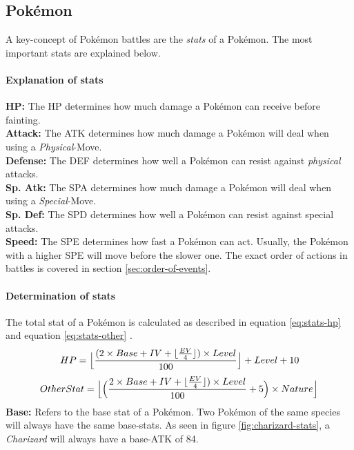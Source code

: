 \subsection{Pokémon}
\label{sec:pokemon}
A key-concept of Pokémon battles are the \textit{stats} of a Pokémon. The most important stats
are explained below. 
\paragraph{Explanation of stats}
\textbf{HP:} The \ac{HP} determines how much damage a Pokémon can receive before fainting. \\
\textbf{Attack:} The \ac{ATK} determines how much damage a Pokémon will deal when using 
a \textit{Physical}-Move. \\
\textbf{Defense:} The \ac{DEF} determines how well a Pokémon can resist against \textit{physical} attacks. \\
\textbf{Sp. Atk:} The \ac{SPA} determines how much damage a Pokémon will deal when using
a \textit{Special}-Move. \\
\textbf{Sp. Def:} The \ac{SPD} determines how well a Pokémon can resist against special attacks. \\
\textbf{Speed:} The \ac{SPE} determines how fast a Pokémon can act. Usually, the Pokémon with a higher
\ac{SPE} will move before the slower one. The exact order of actions in battles is covered in section
\ref{sec:order-of-events}.

\paragraph{Determination of stats}
\label{sec:stat-calculation}
The total stat of a Pokémon is calculated as described in equation \ref{eq:stats-hp} and equation 
\ref{eq:stats-other} \cite{Bulbapedia:Stat}.
\begin{equation}
	\label{eq:stats-hp}
	HP = \Bigl\lfloor \frac{(2 \times Base + IV + \lfloor \frac{EV}{4} \rfloor) \times Level}{100}\Bigr\rfloor
	+ Level + 10 \\
\end{equation}
\begin{equation}
	\label{eq:stats-other}
	OtherStat = \Bigl\lfloor \Big( \frac{2 \times Base + IV + \lfloor \frac{EV}{4} \rfloor) \times Level}
	{100} + 5\Big) \times Nature \Bigr\rfloor
\end{equation}
\textbf{Base:} Refers to the base stat of a Pokémon. Two Pokémon of the same species will always have the 
same base-stats. As seen in figure \ref{fig:charizard-stats}, a \textit{Charizard} will always have a
base-\ac{ATK} of 84.

